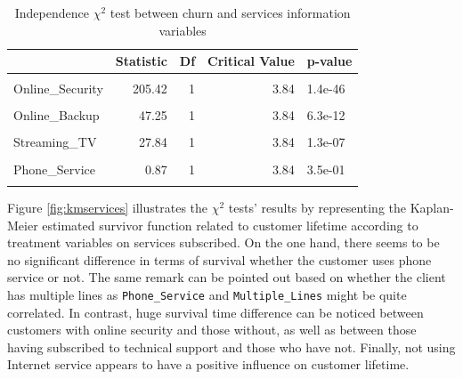 \documentclass[
]{book}
\begin{document}
\begin{table}[H]

\caption{\label{tab:chi2services}Independence $\chi^2$ test between churn and services information variables}
\centering
\begin{tabular}[t]{lrrrl}
\toprule
  & Statistic & Df & Critical Value & p-value\\
\midrule
\cellcolor{gray!6}{Internet\_Service} & \cellcolor{gray!6}{728.70} & \cellcolor{gray!6}{2} & \cellcolor{gray!6}{5.99} & \cellcolor{gray!6}{5.8e-159}\\
Online\_Security & 205.42 & 1 & 3.84 & 1.4e-46\\
\cellcolor{gray!6}{Tech\_Support} & \cellcolor{gray!6}{189.97} & \cellcolor{gray!6}{1} & \cellcolor{gray!6}{3.84} & \cellcolor{gray!6}{3.2e-43}\\
Online\_Backup & 47.25 & 1 & 3.84 & 6.3e-12\\
\cellcolor{gray!6}{Device\_Protection} & \cellcolor{gray!6}{30.50} & \cellcolor{gray!6}{1} & \cellcolor{gray!6}{3.84} & \cellcolor{gray!6}{3.3e-08}\\
\addlinespace
Streaming\_TV & 27.84 & 1 & 3.84 & 1.3e-07\\
\cellcolor{gray!6}{Streaming\_Movies} & \cellcolor{gray!6}{25.76} & \cellcolor{gray!6}{1} & \cellcolor{gray!6}{3.84} & \cellcolor{gray!6}{3.9e-07}\\
Phone\_Service & 0.87 & 1 & 3.84 & 3.5e-01\\
\cellcolor{gray!6}{Multiple\_Lines} & \cellcolor{gray!6}{0.87} & \cellcolor{gray!6}{1} & \cellcolor{gray!6}{3.84} & \cellcolor{gray!6}{3.5e-01}\\
\bottomrule
\end{tabular}
\end{table}

Figure \ref{fig:kmservices} illustrates the \(\chi^2\) tests' results by representing the Kaplan-Meier estimated survivor function related to customer lifetime according to treatment variables on services subscribed. On the one hand, there seems to be no significant difference in terms of survival whether the customer uses phone service or not. The same remark can be pointed out based on whether the client has multiple lines as \texttt{Phone\_Service} and \texttt{Multiple\_Lines} might be quite correlated. In contrast, huge survival time difference can be noticed between customers with online security and those without, as well as between those having subscribed to technical support and those who have not. Finally, not using Internet service appears to have a positive influence on customer lifetime.
\end{document}
